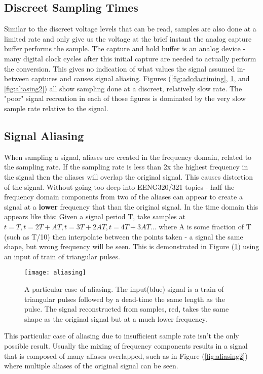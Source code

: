 \documentclass[11pt]{article}
\begin{document}
{	\subsection{Discreet Sampling Times}
	Similar to the discreet voltage levels that can be read, samples are also done at a limited rate and only give us the voltage at the brief instant the analog capture buffer performs the sample. The capture and hold buffer is an analog device - many digital clock cycles after this initial capture are needed to actually perform the conversion. This gives no indication of what values the signal assumed in-between captures and causes signal aliasing. Figures (\ref{fig:adcdactiming}, \ref{fig:aliasing1}, and \ref{fig:aliasing2}) all show sampling done at a discreet, relatively slow rate. The "poor" signal recreation in each of those figures is dominated by the very slow sample rate relative to the signal.
	
	\subsection{Signal Aliasing}
	When sampling a signal, aliases are created in the frequency domain, related to the sampling rate. If the sampling rate is less than 2x the highest frequency in the signal then the aliases will overlap the original signal. This causes distortion of the signal. Without going too deep into EENG320/321 topics - half the frequency domain components from two of the aliases can appear to create a signal at a \textbf{lower} frequency that than the original signal. In the time domain this appears like this: Given a signal period T, take samples at $t=T, t=2T+AT, t=3T+2AT, t=4T+3AT...$ where A is some fraction of T (such as T/10) then interpolate between the points taken - a signal the same shape, but wrong frequency will be seen. This is demonstrated in Figure (\ref{fig:aliasing1}) using an input of train of triangular pulses.
	
	\begin{figure}[H]
		\centering
		\texttt{[image: aliasing]}
		\caption{A particular case of aliasing. The input(blue) signal is a train of triangular pulses followed by a dead-time the same length as the pulse. The signal reconstructed from samples, red, takes the same shape as the original signal but at a much lower frequency.}
		\label{fig:aliasing1}
		\vspace{15px}
	\end{figure}
	
	This particular case of aliasing due to insufficient sample rate isn't the only possible result. Usually the mixing of frequency components results in a signal that is composed of many aliases overlapped, such as in Figure (\ref{fig:aliasing2}) where multiple aliases of the original signal can be seen.
	
}
\end{document}
